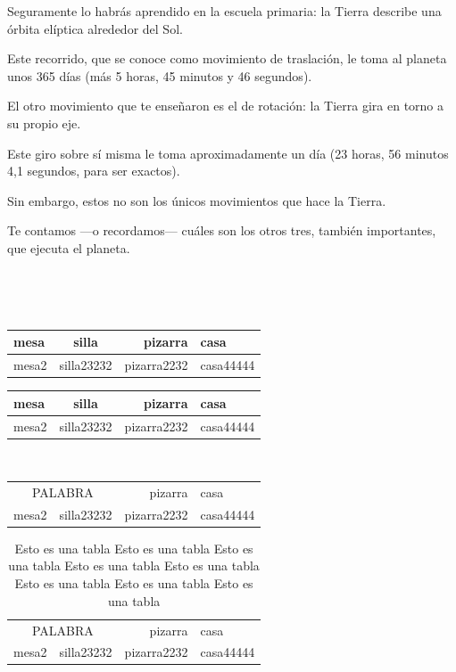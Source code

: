 \documentclass{report}
\begin{document}
Seguramente lo habrás aprendido en la escuela primaria: la Tierra describe una órbita elíptica alrededor del Sol.

Este recorrido, que se conoce como movimiento de traslación, le toma al planeta unos 365 días 
(más 5 horas, 45 minutos y 46 segundos).

El otro movimiento que te enseñaron es el de rotación: la Tierra gira en torno a su propio eje.

Este giro sobre sí misma le toma aproximadamente un día (23 horas, 56 minutos 4,1 segundos, para ser exactos). 

Sin embargo, estos no son los únicos movimientos que hace la Tierra.

Te contamos —o recordamos— cuáles son los otros tres, también importantes, que ejecuta el planeta.

\

\listoftables

\

\begin{tabular}{|l|c|r|p{4cm}|}
	\hline
	mesa & silla & pizarra & casa\\
	\hline
	mesa2 & silla23232 & pizarra2232 & casa44444 \\
	\hline
\end{tabular}

\begin{tabular}{|l|c|r|p{4cm}|}
	\hline
	mesa & silla & pizarra & casa\\
	\hline
	mesa2 & silla23232 & pizarra2232 & casa44444 \\
	\hline
\end{tabular}\\[2cm]

\begin{tabular}{|l|c|r|p{4cm}|}
	\cline{1-2}\cline{4-4}
	\multicolumn{2}{|c|}{PALABRA} & pizarra & casa\\
	\cline{1-2}
	mesa2 & silla23232 & pizarra2232 & casa44444 \\
	\cline{3-4}
\end{tabular}

\begin{table}[H]
	\begin{tabular}{|l|c|r|p{4cm}|}
		\cline{1-2}\cline{4-4}
		\multicolumn{2}{|c|}{PALABRA} & pizarra & casa\\
		\cline{1-2}
		mesa2 & silla23232 & pizarra2232 & casa44444 \\
		\cline{3-4}
	\end{tabular}
		\caption[Esto es una tabla]{Esto es una tabla Esto es una tabla Esto es una tabla Esto es una tabla Esto es una tabla Esto es una tabla Esto es una tabla Esto es una tabla}\label{tab1}
\end{table}
\end{document}
